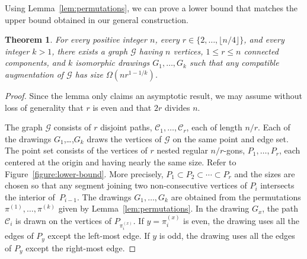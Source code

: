 \documentclass{patmorin}
\newtheorem{theorem}{Theorem}[section]
\begin{document}
Using Lemma~\ref{lem:permutations}, we can prove a lower bound that matches the upper bound obtained in our general construction.

\begin{theorem}\label{thm:lower-bound}
  For every positive integer $n$, every $r\in\{2,\ldots,\lfloor
  n/4\rfloor\}$, and every integer $k>1$, there exists a graph $\mathcal
  G$ having $n$ vertices, $1\leq r\leq n$ connected components, and
  $k$ isomorphic drawings $G_1,\ldots,G_k$ such that any compatible
  augmentation of $\mathcal G$ has size $\Omega(nr^{1-1/k})$.
\end{theorem}

\begin{proof}
Since the lemma only claims an asymptotic result, we may assume without
loss of generality that $r$ is even and that $2r$ divides $n$.

The graph $\mathcal G$ consists of $r$ disjoint paths,
$\mathcal{C}_1,\ldots,\mathcal{C}_r$, each of length $n/r$.  Each of the
drawings $G_1$,\ldots,$G_k$ draws the vertices of $\mathcal G$ on the
same point and edge set. The point set consists of the vertices of
$r$ nested regular $n/r$-gons, $P_1,\ldots,P_r$, each centered at the
origin and having nearly the same size. Refer to Figure~\ref{figure:lower-bound}. More precisely, $P_1\subset P_2\subset\cdots\subset P_r$ and the sizes are chosen so that any segment
joining two non-consecutive vertices of $P_i$ intersects the interior
of~$P_{i-1}$.
The drawings $G_1,\ldots,G_k$ are obtained from the permutations
$\pi^{(1)},\ldots,\pi^{(k)}$ given by \linebreak Lemma~\ref{lem:permutations}.
In the drawing $G_x$, the path $\mathcal C_i$ is drawn on the vertices
of $P_{\pi^{(x)}_i}$. If $y=\pi^{(x)}_i$ is even, the drawing uses
all the edges of $P_y$ except the left-most edge.  If $y$ is odd, the
drawing uses all the edges of $P_y$ except the right-most edge.


\end{proof}
\end{document}
